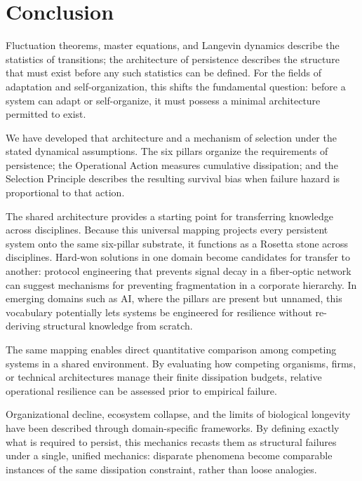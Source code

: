 \section{Conclusion}
\label{sec:conclusion}
Fluctuation theorems, master equations, and Langevin dynamics describe the statistics of transitions; the architecture of persistence describes the structure that must exist before any such statistics can be defined. For the fields of adaptation and self-organization, this shifts the fundamental question: before a system can adapt or self-organize, it must possess a minimal architecture permitted to exist.

We have developed that architecture and a mechanism of selection under the stated dynamical assumptions. The six pillars organize the requirements of persistence; the Operational Action measures cumulative dissipation; and the Selection Principle describes the resulting survival bias when failure hazard is proportional to that action.

The shared architecture provides a starting point for transferring knowledge across disciplines. Because this universal mapping projects every persistent system onto the same six-pillar substrate, it functions as a Rosetta stone across disciplines. Hard-won solutions in one domain become candidates for transfer to another: protocol engineering that prevents signal decay in a fiber-optic network can suggest mechanisms for preventing fragmentation in a corporate hierarchy. In emerging domains such as AI, where the pillars are present but unnamed, this vocabulary potentially lets systems be engineered for resilience without re-deriving structural knowledge from scratch.

The same mapping enables direct quantitative comparison among competing systems in a shared environment. By evaluating how competing organisms, firms, or technical architectures manage their finite dissipation budgets, relative operational resilience can be assessed prior to empirical failure.

Organizational decline, ecosystem collapse, and the limits of biological longevity have been described through domain-specific frameworks. By defining exactly what is required to persist, this mechanics recasts them as structural failures under a single, unified mechanics: disparate phenomena become comparable instances of the same dissipation constraint, rather than loose analogies.

